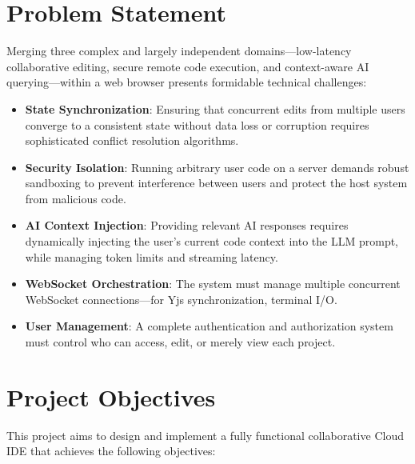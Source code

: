 \documentclass[12pt,a4paper,oneside]{report}
\begin{document}
\section{Problem Statement}

Merging three complex and largely independent domains---low-latency collaborative editing, secure remote code execution, and context-aware AI querying---within a web browser presents formidable technical challenges:

\begin{itemize}
    \item \textbf{State Synchronization}: Ensuring that concurrent edits from multiple users converge to a consistent state without data loss or corruption requires sophisticated conflict resolution algorithms.
    \item \textbf{Security Isolation}: Running arbitrary user code on a server demands robust sandboxing to prevent interference between users and protect the host system from malicious code.
    \item \textbf{AI Context Injection}: Providing relevant AI responses requires dynamically injecting the user's current code context into the LLM prompt, while managing token limits and streaming latency.
    \item \textbf{WebSocket Orchestration}: The system must manage multiple concurrent WebSocket connections---for Yjs synchronization, terminal I/O.
    \item \textbf{User Management}: A complete authentication and authorization system must control who can access, edit, or merely view each project.
\end{itemize}

\section{Project Objectives}

This project aims to design and implement a fully functional collaborative Cloud IDE that achieves the following objectives:
\end{document}

